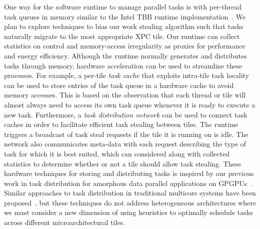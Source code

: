 One way for the software runtime to manage parallel tasks is with
per-thread task queues in memory similar to the Intel TBB runtime
implementation~\cite{reinders-tbb-book2007}.
We plan to explore techniques to bias our work stealing algorithm such
that tasks naturally migrate to the most appropriate XPC tile. Our
runtime can collect statistics on control and memory-access irregularity
as proxies for performance and energy efficiency.
Although the runtime normally generates and distributes tasks through
memory, hardware acceleration can be used to streamline these
processes. For example, a per-tile \emph{task cache} that exploits
intra-tile task locality can be used to store entries of the task queue
in a hardware cache to avoid memory accesses. This is based on the
observation that each thread or tile will almost always need to access
its own task queue whenever it is ready to execute a new
task. Furthermore, a \emph{task distribution network} can be used to
connect task caches in order to facilitate efficient task stealing
between tiles. The runtime triggers a broadcast of task steal requests if
the tile it is running on is idle.
The network also communicates meta-data with each request describing the
type of task for which it is best suited, which can considered along with
collected statistics to determine whether or not a tile should allow task
stealing. These hardware techniques for storing and distributing tasks is
inspired by our previous work in task distribution for amorphous data
parallel applications on GPGPUs~\cite{kim-hwwl-micro2014}.
Similar approaches to task distribution in traditional multicore systems
have been proposed~\cite{kumar-carbon-isca2007,sanchez-adm-asplos2010},
but these techniques do not address heterogeneous architectures where we
must consider a new dimension of using heuristics to optimally schedule
tasks across different microarchitectural tiles.
